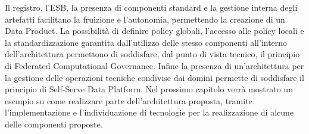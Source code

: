 \documentclass[12pt]{report}
\begin{document}
Il registro, l'ESB, la presenza di componenti standard e la gestione interna degli artefatti facilitano la fruizione e l'autonomia, permettendo la creazione di un Data Product.
La possibilità di definire policy globali, l'accesso alle policy locali e la standardizzazione garantita dall'utilizzo delle stesso componenti all'interno dell'architettura permettono di soddisfare, dal punto di vista tecnico, il principio di Federated Computational Governance.
Infine la presenza di un'architettura per la gestione delle operazioni tecniche condivise dai domini permette di soddisfare il principio di Self-Serve Data Platform.
Nel prossimo capitolo verrà mostrato un esempio su come realizzare parte dell'architettura proposta, tramite l'implementazione e l'individuazione di tecnologie per la realizzazione di alcune delle componenti proposte.
\end{document}
